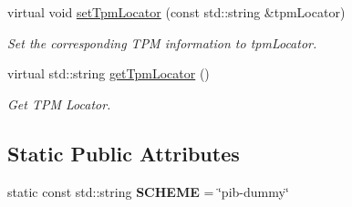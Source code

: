 \begin{DoxyCompactItemize}
virtual void \hyperlink{classndn_1_1security_1_1DummyPublicInfo_a0cc599238fd410be69f8df0c5f71bbf8}{set\+Tpm\+Locator} (const std\+::string \&tpm\+Locator)
\begin{DoxyCompactList}\small\item\em Set the corresponding T\+PM information to {\ttfamily tpm\+Locator}. \end{DoxyCompactList}\item 
virtual std\+::string \hyperlink{classndn_1_1security_1_1DummyPublicInfo_ad682c090d28c703b49b3589d8cd770a2}{get\+Tpm\+Locator} ()
\begin{DoxyCompactList}\small\item\em Get T\+PM Locator. \end{DoxyCompactList}\end{DoxyCompactItemize}
\subsection*{Static Public Attributes}
\begin{DoxyCompactItemize}
\item 
static const std\+::string {\bfseries S\+C\+H\+E\+ME} = \char`\"{}pib-\/dummy\char`\"{}\hypertarget{classndn_1_1security_1_1DummyPublicInfo_ac9b3e6c0fa54e6d412914a1ea66e2c28}{}\label{classndn_1_1security_1_1DummyPublicInfo_ac9b3e6c0fa54e6d412914a1ea66e2c28}

\end{DoxyCompactItemize}
